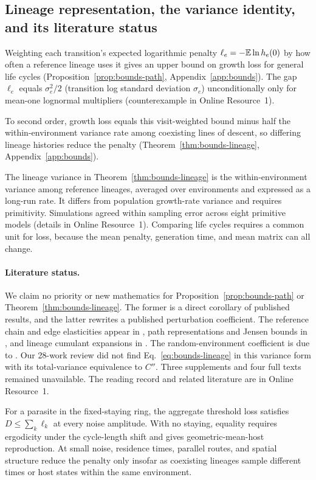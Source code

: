 \subsection{Lineage representation, the variance identity, and its literature status}\label{subsec:bounds-lineage}

Weighting each transition's expected logarithmic penalty $\ell_e = -\mathbb{E}\ln h_e(0)$ by how often a reference lineage uses it gives an upper bound on growth loss for general life cycles (Proposition~\ref{prop:bounds-path}, Appendix~\ref{app:bounds}). The gap $\ell_e$ equals $\sigma_e^2/2$ (transition log standard deviation $\sigma_e$) unconditionally only for mean-one lognormal multipliers (counterexample in Online Resource~1).

To second order, growth loss equals this visit-weighted bound minus half the within-environment variance rate among coexisting lines of descent, so differing lineage histories reduce the penalty (Theorem~\ref{thm:bounds-lineage}, Appendix~\ref{app:bounds}).

The lineage variance in Theorem~\ref{thm:bounds-lineage} is the within-environment variance among reference lineages, averaged over environments and expressed as a long-run rate. It differs from population growth-rate variance and requires primitivity. Simulations agreed within sampling error across eight primitive models (details in Online Resource~1). Comparing life cycles requires a common unit for loss, because the mean penalty, generation time, and mean matrix can all change.

\paragraph{Literature status.}
We claim no priority or new mathematics for Proposition~\ref{prop:bounds-path} or Theorem~\ref{thm:bounds-lineage}. The former is a direct corollary of published results, and the latter rewrites a published perturbation coefficient. The reference chain and edge elasticities appear in \citet{bienvenu2017}, path representations and Jensen bounds in \citet{dombry2011,kobayashi2015,kobayashi2017}, and lineage cumulant expansions in \citet{nozoe2017,levien2020a,genthon2021,yamauchi2022}. The random-environment coefficient is due to \citet{tuljapurkar1982a,tuljapurkar1990,tuljapurkar2006}. Our 28-work review did not find Eq.~\eqref{eq:bounds-lineage} in this variance form with its total-variance equivalence to $C''$. Three supplements and four full texts remained unavailable. The reading record and related literature are in Online Resource~1.

For a parasite in the fixed-staying ring, the aggregate threshold loss satisfies $D\leq\sum_k\ell_k$ at every noise amplitude. With no staying, equality requires ergodicity under the cycle-length shift and gives geometric-mean-host reproduction. At small noise, residence times, parallel routes, and spatial structure reduce the penalty only insofar as coexisting lineages sample different times or host states within the same environment.
